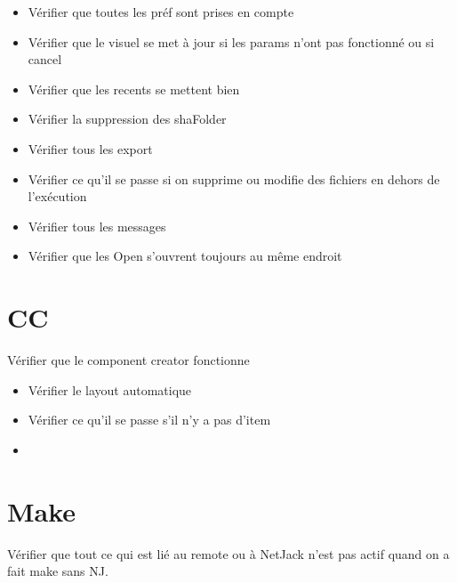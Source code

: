 \documentclass[a4paper]{article}
\begin{document}
\begin{itemize}
\item Vérifier que toutes les préf sont prises en compte 
\item Vérifier que le visuel se met à jour si les params n'ont pas fonctionné ou si cancel
\item Vérifier que les recents se mettent bien
\item Vérifier la suppression des shaFolder
\item Vérifier tous les export
\end{itemize}

\begin{itemize}
\item Vérifier ce qu'il se passe si on supprime ou modifie des fichiers en dehors de l'exécution
\item Vérifier tous les messages
\item Vérifier que les Open s'ouvrent toujours au même endroit
\end{itemize}

\section{CC}

Vérifier que le component creator fonctionne
\begin{itemize}
\item Vérifier le layout automatique
\item Vérifier ce qu'il se passe s'il n'y a pas d'item
\item 
\end{itemize}

\section{Make}

Vérifier que tout ce qui est lié au remote ou à NetJack n'est pas actif quand on a fait make sans NJ.
\end{document}
